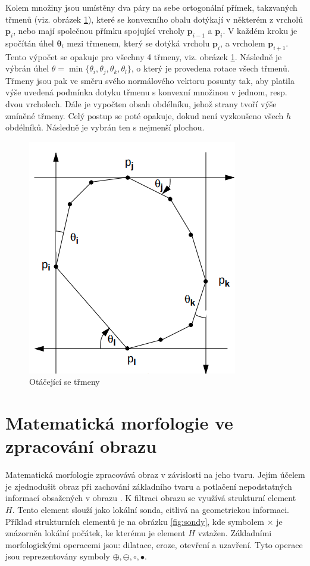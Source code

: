 \documentclass[twoside]{ctuthesis}
\newcommand{\tli}[2]{$\mathbf{#1}_{#2}$}
\begin{document}
Kolem množiny jsou umístěny dva páry na sebe ortogonální přímek, takzvaných třmenů (viz. obrázek \ref{fig:rotating_calipers}), které se konvexního obalu dotýkají v některém z vrcholů $\mathbf{p}_i$, nebo mají společnou přímku spojující vrcholy \tli{p}{i-1} a \tli{p}{i}. V každém kroku je spočítán úhel \tli{\theta}{i} mezi třmenem, který se dotýká vrcholu \tli{p}{i}, a vrcholem \tli{p}{i+1}. Tento výpočet se opakuje pro všechny 4 třmeny, viz. obrázek \ref{fig:rotating_calipers}. Následně je výbrán úhel $\theta = \min \{ \theta_i, \theta_j, \theta_k, \theta_l \}$, o který je provedena rotace všech třmenů. Třmeny jsou pak ve směru svého normálového vektoru posunty tak, aby platila výše uvedená podmínka dotyku třmenu s konvexní množinou v jednom, resp. dvou vrcholech. Dále je vypočten obsah obdélníku, jehož strany tvoří výše zmíněné třmeny. Celý postup se poté opakuje, dokud není vyzkoušeno všech $h$ obdélníků. Následně je vybrán ten s nejmenší plochou. \cite{toussaint1984complexity}

\begin{figure}
    \centering
    \includegraphics[width = 0.5\linewidth]{pictures/rotating_calipers.png}
    \caption{Otáčející se třmeny \cite{toussaint1984complexity}}
    \label{fig:rotating_calipers}
\end{figure}

\section{Matematická morfologie ve zpracování obrazu}
\label{sec:morphology}

Matematická morfologie zpracovává obraz v závislosti na jeho tvaru. Jejím účelem je zjednodušit obraz při zachování základního tvaru a potlačení nepodstatných informací obsažených v obrazu \cite{haralick1987image}. K filtraci obrazu se využívá strukturní element $H$. Tento element slouží jako lokální sonda, citlivá na geometrickou informaci. Příklad strukturních elementů je na obrázku \ref{fig:sondy}, kde symbolem $\times$ je znázorněn lokální počátek, ke kterému je element $H$ vztažen. Základními morfologickými operacemi jsou: dilatace, eroze, otevření a uzavření. Tyto operace jsou reprezentovány symboly $\oplus, \ominus, \circ, \bullet$.
\end{document}
